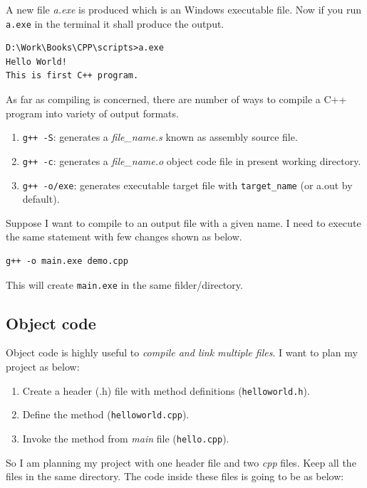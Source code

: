 \documentclass{book}
\begin{document}
A new file \emph{a.exe} is produced which is an Windows executable file. Now if you run \texttt{a.exe} in the terminal it shall produce the output. 

\begin{verbatim}
D:\Work\Books\CPP\scripts>a.exe
Hello World!
This is first C++ program.
\end{verbatim}

As far as compiling is concerned, there are number of ways to compile a C++ program into variety of output formats. 

\begin{enumerate}
	\item \texttt{g++ -S}: generates a \emph{file\_name.s} known as assembly source file. 
	\item \texttt{g++ -c}: generates a \emph{file\_name.o} object code file in present working directory.
	\item \texttt{g++ -o/exe}: generates executable target file with \texttt{target\_name} (or a.out by default).
\end{enumerate}

Suppose I want to compile to an output file with a given name. I need to execute the same statement with few changes shown as below. 

\begin{verbatim}
g++ -o main.exe demo.cpp
\end{verbatim}

This will create \texttt{main.exe} in the same filder/directory. 

\subsection{Object code}

Object code is highly useful to \emph{compile and link multiple files}. I want to plan my project as below: 

\begin{enumerate}
	\item Create a header (.h) file with method definitions (\texttt{helloworld.h}). 
	\item Define the method (\texttt{helloworld.cpp}). 
	\item Invoke the method from \emph{main} file (\texttt{hello.cpp}). 
\end{enumerate}

So I am planning my project with one header file and two \emph{cpp} files. Keep all the files in the same directory. The code inside these files is going to be as below: 
\end{document}
